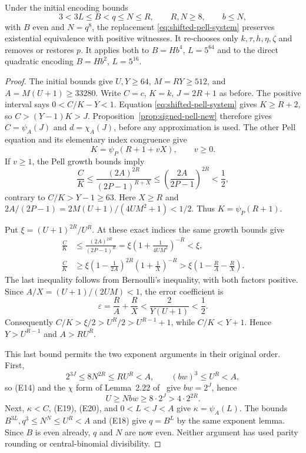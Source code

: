 \begin{lemma}\label{lem:shifted-pell}
Under the initial encoding bounds
\[
 3<3L\le B<q\le N\le R,\qquad R,N\ge8,\qquad b\le N,
\]
with $B$ even and $N=q^8$, the replacement
\eqref{eq:shifted-pell-system} preserves existential equivalence with
positive witnesses. It re-chooses only $k,\tau,h,\eta,\zeta$ and removes
or restores $p$. It applies both to $B=Hb^4$, $L=5^{64}$ and to the
direct quadratic encoding $B=Hb^2$, $L=5^{16}$.
\end{lemma}
\begin{proof}
The initial bounds give $U,Y\ge64$, $M=RY\ge512$, and
$A=M(U+1)\ge33280$. Write $C=c$, $K=k$, $J=2R+1$ as before.
The positive interval says $0<C/K-Y<1$. Equation
\eqref{eq:shifted-pell-system} gives $K\ge R+2$, so
$C>(Y-1)K>J$. Proposition~\ref{prop:signed-pell-new} therefore gives
$C=\psi_A(J)$ and $d=\chi_A(J)$, before any approximation is used.
The other Pell equation and its elementary index congruence give
\[
 K=\psi_P(R+1+vX),\qquad v\ge0.
\]
If $v\ge1$, the Pell growth bounds imply
\[
 \frac CK\le\frac{(2A)^{2R}}{(2P-1)^{R+X}}
 \le\left(\frac{2A}{2P-1}\right)^{2R}<\frac12,
\]
contrary to $C/K>Y-1\ge63$. Here $X\ge R$ and
$2A/(2P-1)=2M(U+1)/(4UM^2+1)<1/2$. Thus
$K=\psi_P(R+1)$.

Put $\xi=(U+1)^{2R}/U^R$. At these exact indices the same growth bounds
give
\begin{align}
 \frac CK
 &\le\frac{(2A)^{2R}}{(2P-1)^R}
   =\xi\left(1+\frac1{4UM^2}\right)^{-R}<\xi,
       \label{eq:shifted-upper}\\
 \frac CK
 &\ge\xi\left(1-\frac1{2A}\right)^{2R}
             \left(1+\frac1X\right)^{-R}
  >\xi\left(1-\frac RA-\frac RX\right).
       \label{eq:shifted-lower}
\end{align}
The last inequality follows from Bernoulli's inequality, with both
factors positive. Since $A/X=(U+1)/(2UM)<1$, the error coefficient is
\[
 \varepsilon=\frac RA+\frac RX
 <\frac{2}{Y(U+1)}<\frac12.
\]
Consequently $C/K>\xi/2>U^R/2>U^{R-1}+1$, while $C/K<Y+1$.
Hence $Y>U^{R-1}$ and $A>RU^R$.

This last bound permits the two exponent arguments in their original
order. First,
\[
 2^{3J}\le8N^{2R}\le RU^R<A,\qquad (bw)^3\le U^R<A,
\]
so (E14) and the $\chi$ form of Lemma~2.22 of~\cite{J82} give
$bw=2^J$, hence
\begin{equation}\label{eq:shifted-u-bound}
 U\ge Nbw\ge8\cdot2^J>4\cdot2^{2R}.
\end{equation}
Next, $\kappa<C$, (E19), (E20), and $0<L<J<A$ give
$\kappa=\psi_A(L)$. The bounds
$B^{3L},q^3\le N^N\le U^R<A$ and (E18) give $q=B^L$ by the same
exponent lemma. Since $B$ is even already, $q$ and $N$ are now even.
Neither argument has used parity rounding or central-binomial
divisibility.


\end{proof}

